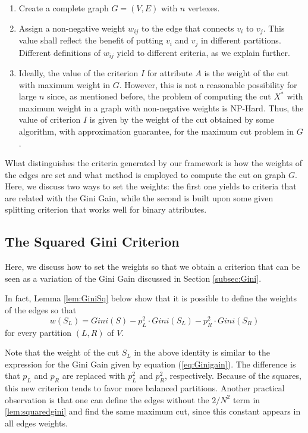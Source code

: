 \begin{enumerate}
\item  Create a complete graph $G=(V,E)$ with $n$ vertexes.

\item  Assign a non-negative weight $w_{ij}$ to the edge 
that connects $v_i$ to $v_j$. This value shall reflect the benefit of putting  $v_i$ and $v_j$ in different partitions.
Different definitions of $w_{ij}$ yield to different criteria,
as we explain further.

\item  Ideally, the value of the criterion $I$ for attribute
$A$ is the weight of the cut with maximum weight  in $G$.
However, this is not a reasonable possibility for large $n$ since, as mentioned before, the problem of computing the  cut $X^*$ with maximum weight in a graph with non-negative weights is NP-Hard.
Thus, the value of criterion $I$ is given by the weight
of the cut obtained by some  algorithm, with approximation guarantee, for the maximum cut
problem in $G$.   
\end{enumerate}

What distinguishes the  criteria
generated  by our framework
is how the weights of the edges are set and what 
method is employed to compute the cut on graph $G$.
Here, we discuss two ways to set the weights:
the first one yields to criteria that
are related with the Gini Gain, while the second 
is built upon some given splitting  criterion that works well for binary attributes.


\subsection{The Squared Gini Criterion}
Here, we discuss how to set the weights so that we obtain 
a criterion that can be seen as a variation of the Gini Gain discussed in Section \ref{subsec:Gini}.

In fact, Lemma \ref{lem:GiniSq} below  show that  it is possible to define the
weights of the edges so that 
\begin{equation}
 \label{lem:squaredgini}
w(S_L)= Gini(S) - p^2_L \cdot Gini(S_L) - p^2_R \cdot Gini(S_R) 
\end{equation}
for every partition $(L,R)$ of $V$. 

Note that the weight of the cut  $S_L$ in the above identity 
is similar to the expression for the Gini Gain given by equation (\ref{eq:Ginigain}).
The difference is that $p_L$ and $p_R$ are replaced with
$p_L^2$ and $p_R^2$, respectively. Because of the squares, this new criterion tends to favor more balanced partitions. Another practical observation is that one can define the edges without the $2/N^2$ term in \ref{lem:squaredgini} and find the same maximum cut, since this constant appears in all edges weights.


